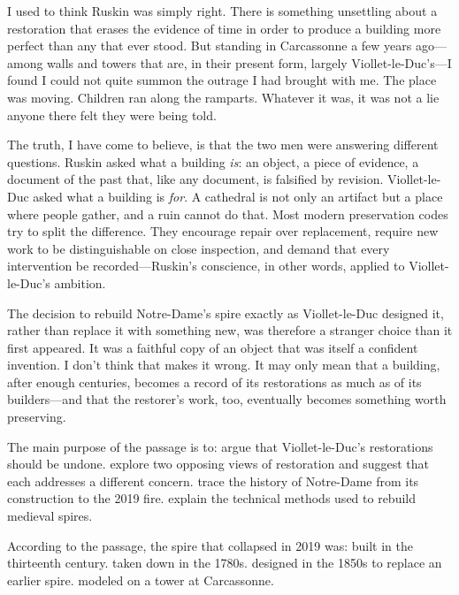 \documentclass[11pt]{article}
\begin{document}
\begin{passage}
I used to think Ruskin was simply right. There is something unsettling about a restoration that erases the evidence of time in order to produce a building more perfect than any that ever stood. But standing in Carcassonne a few years ago---among walls and towers that are, in their present form, largely Viollet-le-Duc's---I found I could not quite summon the outrage I had brought with me. The place was moving. Children ran along the ramparts. Whatever it was, it was not a lie anyone there felt they were being told.

The truth, I have come to believe, is that the two men were answering different questions. Ruskin asked what a building \emph{is}: an object, a piece of evidence, a document of the past that, like any document, is falsified by revision. Viollet-le-Duc asked what a building is \emph{for}. A cathedral is not only an artifact but a place where people gather, and a ruin cannot do that. Most modern preservation codes try to split the difference. They encourage repair over replacement, require new work to be distinguishable on close inspection, and demand that every intervention be recorded---Ruskin's conscience, in other words, applied to Viollet-le-Duc's ambition.

The decision to rebuild Notre-Dame's spire exactly as Viollet-le-Duc designed it, rather than replace it with something new, was therefore a stranger choice than it first appeared. It was a faithful copy of an object that was itself a confident invention. I don't think that makes it wrong. It may only mean that a building, after enough centuries, becomes a record of its restorations as much as of its builders---and that the restorer's work, too, eventually becomes something worth preserving.
\end{passage}

{The main purpose of the passage is to:}
{argue that Viollet-le-Duc's restorations should be undone.}
{explore two opposing views of restoration and suggest that each addresses a different concern.}
{trace the history of Notre-Dame from its construction to the 2019 fire.}
{explain the technical methods used to rebuild medieval spires.}

{According to the passage, the spire that collapsed in 2019 was:}
{built in the thirteenth century.}
{taken down in the 1780s.}
{designed in the 1850s to replace an earlier spire.}
{modeled on a tower at Carcassonne.}
\end{document}
